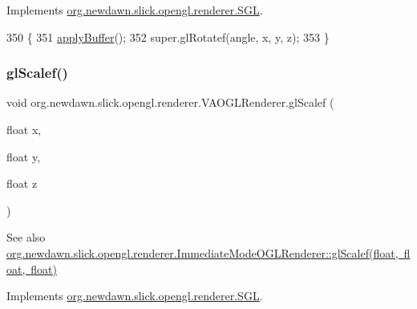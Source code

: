Implements \mbox{\hyperlink{interfaceorg_1_1newdawn_1_1slick_1_1opengl_1_1renderer_1_1_s_g_l_ac5675bd1b391998a8bf63d5d87a04347}{org.\+newdawn.\+slick.\+opengl.\+renderer.\+S\+GL}}.


\begin{DoxyCode}
350                                                                   \{
351         \mbox{\hyperlink{classorg_1_1newdawn_1_1slick_1_1opengl_1_1renderer_1_1_v_a_o_g_l_renderer_a7c5d09419cd40761be8f849631aebab5}{applyBuffer}}();
352         super.glRotatef(angle, x, y, z);
353     \}
\end{DoxyCode}
\mbox{\label{classorg_1_1newdawn_1_1slick_1_1opengl_1_1renderer_1_1_v_a_o_g_l_renderer_a6bab623953faef3cac8d299201434b5f}} 
\subsubsection{\texorpdfstring{gl\+Scalef()}{glScalef()}}
{\footnotesize\ttfamily void org.\+newdawn.\+slick.\+opengl.\+renderer.\+V\+A\+O\+G\+L\+Renderer.\+gl\+Scalef (\begin{DoxyParamCaption}\item[{float}]{x,  }\item[{float}]{y,  }\item[{float}]{z }\end{DoxyParamCaption})\hspace{0.3cm}{\ttfamily [inline]}}

\begin{DoxySeeAlso}{See also}
\mbox{\hyperlink{classorg_1_1newdawn_1_1slick_1_1opengl_1_1renderer_1_1_immediate_mode_o_g_l_renderer_ae2a00de1d4a29e658ca63685b1870413}{org.\+newdawn.\+slick.\+opengl.\+renderer.\+Immediate\+Mode\+O\+G\+L\+Renderer\+::gl\+Scalef(float, float, float)}} 
\end{DoxySeeAlso}


Implements \mbox{\hyperlink{interfaceorg_1_1newdawn_1_1slick_1_1opengl_1_1renderer_1_1_s_g_l_a3af948fb9b1074143a0ce384a2035d02}{org.\+newdawn.\+slick.\+opengl.\+renderer.\+S\+GL}}.



